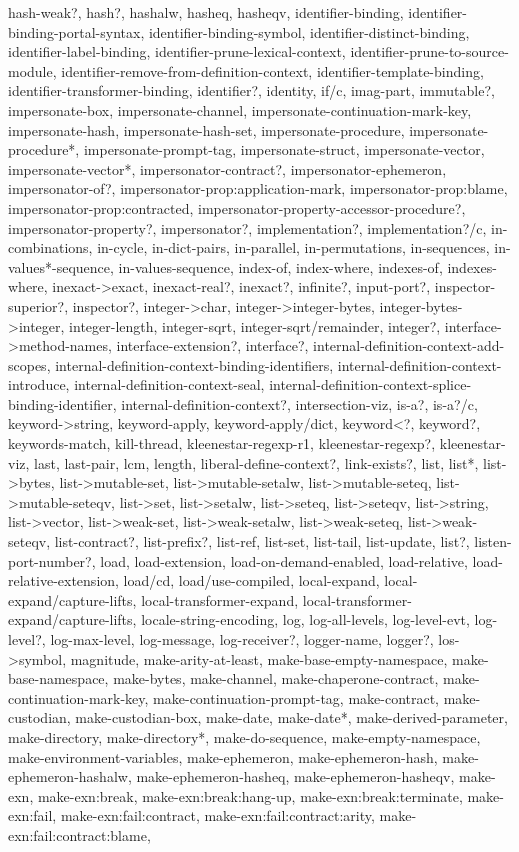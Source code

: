 {{hash-weak?, hash?, hashalw, hasheq, hasheqv, identifier-binding, identifier-binding-portal-syntax, identifier-binding-symbol, identifier-distinct-binding, identifier-label-binding, identifier-prune-lexical-context, identifier-prune-to-source-module, identifier-remove-from-definition-context, identifier-template-binding, identifier-transformer-binding, identifier?, identity, if/c, imag-part, immutable?, impersonate-box, impersonate-channel, impersonate-continuation-mark-key, impersonate-hash, impersonate-hash-set, impersonate-procedure, impersonate-procedure*, impersonate-prompt-tag, impersonate-struct, impersonate-vector, impersonate-vector*, impersonator-contract?, impersonator-ephemeron, impersonator-of?, impersonator-prop:application-mark, impersonator-prop:blame, impersonator-prop:contracted, impersonator-property-accessor-procedure?, impersonator-property?, impersonator?, implementation?, implementation?/c, in-combinations, in-cycle, in-dict-pairs, in-parallel, in-permutations, in-sequences, in-values*-sequence, in-values-sequence, index-of, index-where, indexes-of, indexes-where, inexact->exact, inexact-real?, inexact?, infinite?, input-port?, inspector-superior?, inspector?, integer->char, integer->integer-bytes, integer-bytes->integer, integer-length, integer-sqrt, integer-sqrt/remainder, integer?, interface->method-names, interface-extension?, interface?, internal-definition-context-add-scopes, internal-definition-context-binding-identifiers, internal-definition-context-introduce, internal-definition-context-seal, internal-definition-context-splice-binding-identifier, internal-definition-context?, intersection-viz, is-a?, is-a?/c, keyword->string, keyword-apply, keyword-apply/dict, keyword<?, keyword?, keywords-match, kill-thread, kleenestar-regexp-r1, kleenestar-regexp?, kleenestar-viz, last, last-pair, lcm, length, liberal-define-context?, link-exists?, list, list*, list->bytes, list->mutable-set, list->mutable-setalw, list->mutable-seteq, list->mutable-seteqv, list->set, list->setalw, list->seteq, list->seteqv, list->string, list->vector, list->weak-set, list->weak-setalw, list->weak-seteq, list->weak-seteqv, list-contract?, list-prefix?, list-ref, list-set, list-tail, list-update, list?, listen-port-number?, load, load-extension, load-on-demand-enabled, load-relative, load-relative-extension, load/cd, load/use-compiled, local-expand, local-expand/capture-lifts, local-transformer-expand, local-transformer-expand/capture-lifts, locale-string-encoding, log, log-all-levels, log-level-evt, log-level?, log-max-level, log-message, log-receiver?, logger-name, logger?, los->symbol, magnitude, make-arity-at-least, make-base-empty-namespace, make-base-namespace, make-bytes, make-channel, make-chaperone-contract, make-continuation-mark-key, make-continuation-prompt-tag, make-contract, make-custodian, make-custodian-box, make-date, make-date*, make-derived-parameter, make-directory, make-directory*, make-do-sequence, make-empty-namespace, make-environment-variables, make-ephemeron, make-ephemeron-hash, make-ephemeron-hashalw, make-ephemeron-hasheq, make-ephemeron-hasheqv, make-exn, make-exn:break, make-exn:break:hang-up, make-exn:break:terminate, make-exn:fail, make-exn:fail:contract, make-exn:fail:contract:arity, make-exn:fail:contract:blame, }}
